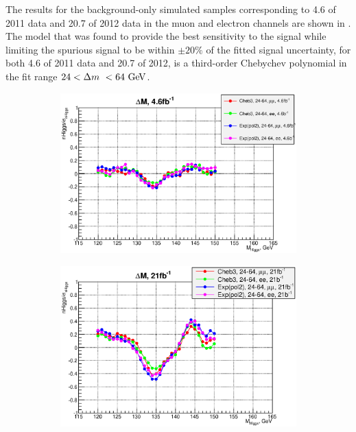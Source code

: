 The results for the background-only simulated samples corresponding to 4.6 \ifb
of 2011 data and 20.7 \ifb of 2012 data in the muon and electron channels are
shown in . The model that was found to provide the best 
sensitivity to the signal while limiting
the spurious signal to be within $\pm20\%$ of the fitted signal uncertainty, for
both 4.6 \ifb of 2011 data and 20.7 \ifb of 2012, is a third-order 
Chebychev polynomial in the fit range $24 < \dm < 64 \GeV$.

\begin{figure}[htbp]
    \centering
    \begin{subfigure}[b]{0.45\textwidth}
      \centering
      \includegraphics[width=\textwidth]{figures/rat4orig.eps}
      \caption{}
      \label{fig:4spurious}
    \end{subfigure}
    \quad
    \begin{subfigure}[b]{0.45\textwidth}
      \centering
      \includegraphics[width=\textwidth]{figures/rat21orig.eps}

\end{subfigure}
\end{figure}

